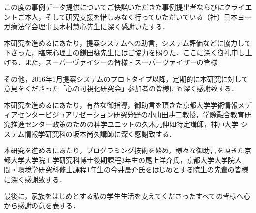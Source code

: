 \documentclass[shuuron]{kuee}
\begin{document}
\begin{acknowledgements}
  この度の事例データ提供についてご快諾いただきた事例提出者ならびにクライエントご本人，そして研究支援を惜しみなく行っていただいている（社）日本ヨーガ療法学会理事長木村慧心先生に深く感謝いたする．

本研究を進めるにあたり，提案システムへの助言，システム評価などに協力して下さった，臨床心理士の鎌田穣先生にはご協力を賜りた．ここに深く御礼申し上げる．また，スーパーヴァイジーの皆様・スーパーヴァイザーの皆様

その他，2016年1月提案システムのプロトタイプ以降，定期的に本研究に対して意見をくださった「心の可視化研究会」参加者の皆様にも深く感謝致する．

本研究を進めるにあたり，有益な御指導，御助言を頂きた京都大学学術情報メディアセンタービジュアリゼーション研究分野の小山田耕二教授，学際融合教育研究推進センター政策のための科学ユニットの久木元伸如特定講師，神戸大学 システム情報学研究科の坂本尚久講師に深く感謝致する．



本研究を進めるにあたり，プログラミング技術を始め，様々な御助言を頂きた京都大学大学院工学研究科博士後期課程3年生の尾上洋介氏，京都大学大学院人間・環境学研究科修士課程1年生の今井晨介氏をはじめとする院生の先輩の皆様に深く感謝致する．

最後に，家族をはじめとする私の学生生活を支えてくださったすべての皆様へ心から感謝の意を表する．
\end{acknowledgements}





\end{document}
